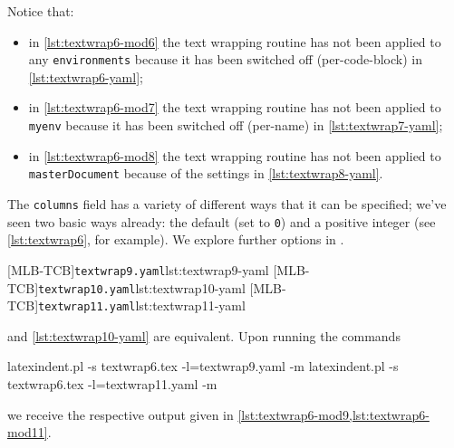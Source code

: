 	Notice that:
	\begin{itemize}
		\item in \cref{lst:textwrap6-mod6} the text wrapping routine has not been applied to any
		      \texttt{environments} because it has been switched off (per-code-block) in
		      \cref{lst:textwrap6-yaml};
		\item in \cref{lst:textwrap6-mod7} the text wrapping routine has not been applied to
		      \texttt{myenv} because it has been switched off (per-name) in
		      \cref{lst:textwrap7-yaml};
		\item in \cref{lst:textwrap6-mod8} the text wrapping routine has not been applied to
		      \texttt{masterDocument} because of the settings in \cref{lst:textwrap8-yaml}.
	\end{itemize}

	The \texttt{columns} field has a variety of different ways that it can be
	specified; we've seen two basic ways already: the default (set to
	\texttt{0}) and a positive integer (see \vref{lst:textwrap6}, for
	example). We explore further options in .

	\begin{cmhtcbraster}[raster columns=3,
			raster left skip=-3.5cm,
			raster right skip=-2cm,
			raster column skip=.03\linewidth]
		[MLB-TCB]{\texttt{textwrap9.yaml}}{lst:textwrap9-yaml}
		[MLB-TCB]{\texttt{textwrap10.yaml}}{lst:textwrap10-yaml}
		[MLB-TCB]{\texttt{textwrap11.yaml}}{lst:textwrap11-yaml}
	\end{cmhtcbraster}

	 and \cref{lst:textwrap10-yaml} are equivalent. Upon running
	the commands
	\begin{commandshell}
latexindent.pl -s textwrap6.tex -l=textwrap9.yaml -m
latexindent.pl -s textwrap6.tex -l=textwrap11.yaml -m
\end{commandshell}
	we receive the respective output given in \cref{lst:textwrap6-mod9,lst:textwrap6-mod11}.

	\begin{widepage}

	\end{widepage}

